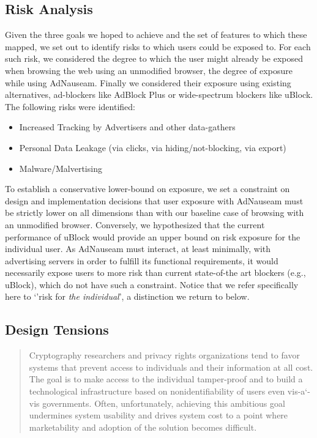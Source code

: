 \documentclass[conference]{IEEEtran}
\begin{document}
\subsection{Risk Analysis}

Given the three goals we hoped to achieve and the set of features to which these mapped, we set out to identify risks to which users could be exposed to. For each such risk, we considered the degree to which the user might already be exposed when browsing the web using an unmodified browser, the degree of exposure while using AdNauseam. Finally we considered their exposure using existing alternatives, ad-blockers like AdBlock Plus\cite{AdBlock} or wide-spectrum blockers like uBlock\cite{Gorhill}. The following risks were identified:

\begin{itemize}
  \item Increased Tracking by Advertisers and other data-gathers
  \item Personal Data Leakage (via clicks, via hiding/not-blocking, via export)
  \item Malware/Malvertising
\end{itemize}

To establish a conservative lower-bound on exposure, we set a constraint on design and implementation decisions that user exposure with AdNauseam must be strictly lower on all dimensions than with our  baseline case of browsing with an unmodified browser. Conversely, we hypothesized that the current performance of uBlock would provide an upper bound on risk exposure for the individual user. As AdNauseam must interact, at least minimally, with advertising servers in order to fulfill its functional requirements, it would necessarily expose users to more risk than current state-of-the art blockers (e.g., uBlock), which do not have such a constraint. Notice that we refer specifically here to `'risk for \emph{the individual}', a distinction we return to below.

\subsection{Design Tensions}

\blockquote{Cryptography researchers and privacy rights organizations tend to favor systems that prevent access to individuals and their information at all cost. The goal is to make access to
the individual tamper-proof and to build a technological infrastructure based on nonidentifiability of users even vis-a`-vis governments. Often, unfortunately, achieving this ambitious goal undermines system usability and drives system cost to a point where marketability and adoption of the solution becomes difficult.}\cite{Spiekermann}
\end{document}
